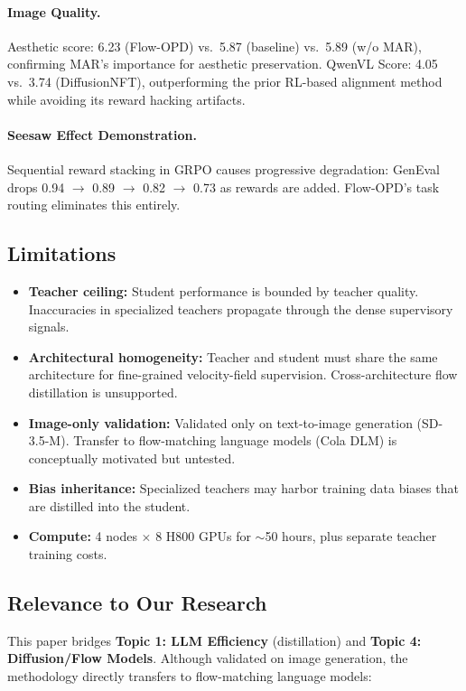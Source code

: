 \documentclass[11pt]{article}
\begin{document}
\paragraph{Image Quality.}
Aesthetic score: 6.23 (Flow-OPD) vs.\ 5.87 (baseline) vs.\ 5.89 (w/o MAR), confirming MAR's importance for aesthetic preservation. QwenVL Score: 4.05 vs.\ 3.74 (DiffusionNFT), outperforming the prior RL-based alignment method while avoiding its reward hacking artifacts.

\paragraph{Seesaw Effect Demonstration.}
Sequential reward stacking in GRPO causes progressive degradation: GenEval drops 0.94 $\to$ 0.89 $\to$ 0.82 $\to$ 0.73 as rewards are added. Flow-OPD's task routing eliminates this entirely.

\subsection{Limitations}

\begin{itemize}
    \item \textbf{Teacher ceiling:} Student performance is bounded by teacher quality. Inaccuracies in specialized teachers propagate through the dense supervisory signals.
    \item \textbf{Architectural homogeneity:} Teacher and student must share the same architecture for fine-grained velocity-field supervision. Cross-architecture flow distillation is unsupported.
    \item \textbf{Image-only validation:} Validated only on text-to-image generation (SD-3.5-M). Transfer to flow-matching language models (Cola DLM) is conceptually motivated but untested.
    \item \textbf{Bias inheritance:} Specialized teachers may harbor training data biases that are distilled into the student.
    \item \textbf{Compute:} 4 nodes $\times$ 8 H800 GPUs for $\sim$50 hours, plus separate teacher training costs.
\end{itemize}

\subsection{Relevance to Our Research}

This paper bridges \textbf{Topic 1: LLM Efficiency} (distillation) and \textbf{Topic 4: Diffusion/Flow Models}. Although validated on image generation, the methodology directly transfers to flow-matching language models:
\end{document}
